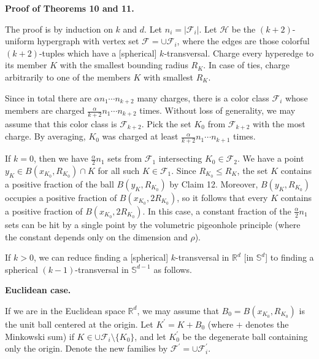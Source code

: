 \documentclass[10pt,a4paper]{amsart}
\begin{document}
\par\medskip\noindent\textbf{Proof of Theorems 10 and 11.}\par
The proof is by induction on $k$ and $d$. Let $n_{i}=|\mathcal{F}_{i}|$. Let $\mathcal{H}$ be the $(k+2)$-uniform hypergraph with vertex set $\mathcal{F}=\cup\mathcal{F}_{i}$, where the edges are those colorful $(k+2)$-tuples which have a [spherical] $k$-transversal. Charge every hyperedge to its member $K$ with the smallest bounding radius $R_{K}$. In case of ties, charge arbitrarily to one of the members $K$ with smallest $R_{K}$.
\par
\par
Since in total there are $\alpha n_{1}\cdots n_{k+2}$ many charges, there is a color class $\mathcal{F}_{i}$ whose members are charged $\frac{\alpha}{k+2}n_{1}\cdots n_{k+2}$ times. Without loss of generality, we may assume that this color class is $\mathcal{F}_{k+2}$. Pick the set $K_{0}$ from $\mathcal{F}_{k+2}$ with the most charge. By averaging, $K_{0}$ was charged at least $\frac{\alpha}{k+2}n_{1}\cdots n_{k+1}$ times.
\par
\par
If $k=0$, then we have $\frac{\alpha}{2}n_{1}$ sets from $\mathcal{F}_{1}$ intersecting $K_{0}\in\mathcal{F}_{2}$. We have a point $y_{K}\in B(x_{K_{0}},R_{K_{0}})\cap K$ for all such $K\in\mathcal{F}_{1}$. Since $R_{K_{0}}\leq R_{K}$, the set $K$ contains a positive fraction of the ball $B(y_{K},R_{K_{0}})$ by Claim 12. Moreover, $B(y_{K},R_{K_{0}})$ occupies a positive fraction of $B(x_{K_{0}},2R_{K_{0}})$, so it follows that every $K$ contains a positive fraction of $B(x_{K_{0}},2R_{K_{0}})$. In this case, a constant fraction of the $\frac{\alpha}{2}n_{1}$ sets can be hit by a single point by the volumetric pigeonhole principle (where the constant depends only on the dimension and $\rho$).
\par
\par
If $k>0$, we can reduce finding a [spherical] $k$-transversal in $\mathbb{R}^{d}$ [in $\mathbb{S}^{d}$] to finding a spherical $(k-1)$-transversal in $\mathbb{S}^{d-1}$ as follows.
\par
\par
\par
\par\medskip\noindent\textbf{Euclidean case.}\par
If we are in the Euclidean space $\mathbb{R}^{d}$, we may assume that $B_{0}=B(x_{K_{0}},R_{K_{0}})$ is the unit ball centered at the origin. Let $K^{\prime}=K+B_{0}$ (where $+$ denotes the Minkowski sum) if $K\in\cup\mathcal{F}_{i}\setminus\{K_{0}\}$, and let $K_{0}^{\prime}$ be the degenerate ball containing only the origin. Denote the new families by $\mathcal{F}^{\prime}=\cup\mathcal{F}_{i}^{\prime}$.
\end{document}
